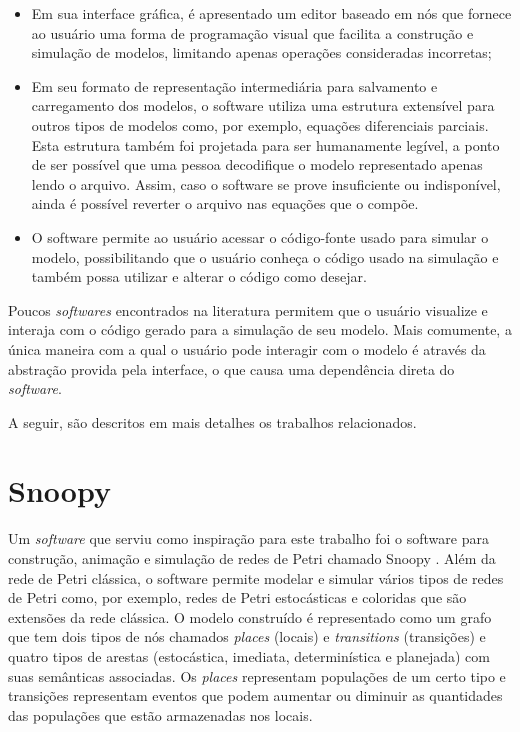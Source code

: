 \documentclass[
	12pt,				%
	openright,			%
	oneside,			%
	a4paper,			%
	main=brazil,
	english,			%
	]{ufsj-abntex2}
\begin{document}
\begin{itemize}
    \item Em sua interface gráfica, é apresentado um editor baseado em nós que fornece ao usuário uma forma de programação visual que facilita a construção e simulação de modelos, limitando apenas operações consideradas incorretas;
    
    \item Em seu formato de representação intermediária para salvamento e carregamento dos modelos, o software utiliza uma estrutura extensível para outros tipos de modelos como, por exemplo, equações diferenciais parciais. Esta estrutura também foi projetada para ser humanamente legível, a ponto de ser possível que uma pessoa decodifique o modelo representado apenas lendo o arquivo. Assim, caso o software se prove insuficiente ou indisponível, ainda é possível reverter o arquivo nas equações que o compõe. 
    
    \item O software permite ao usuário acessar o código-fonte usado para simular o modelo, possibilitando que o usuário conheça o código usado na simulação e também possa utilizar e alterar o código como desejar.   
\end{itemize}

Poucos \textit{softwares} encontrados na literatura permitem que o usuário visualize e interaja com o código gerado para a simulação de seu modelo. Mais comumente, a única maneira com a qual o usuário pode interagir com o modelo é através da abstração provida pela interface, o que causa uma dependência direta do \textit{software}.

A seguir, são descritos em mais detalhes os trabalhos relacionados. 

\section{Snoopy}

Um \textit{software} que serviu como inspiração para este trabalho foi o software para construção, animação e simulação de redes de Petri chamado Snoopy \cite{Heiner2008,Heiner2012,Liu2012}. Além da rede de Petri clássica, o software permite modelar e simular vários tipos de redes de Petri como, por exemplo, redes de Petri estocásticas e coloridas que são extensões da rede clássica. O modelo construído é representado como um grafo que tem dois tipos de nós chamados \textit{places} (locais) e \textit{transitions} (transições) e quatro tipos de arestas (estocástica, imediata, determinística e planejada) com suas semânticas associadas. Os \textit{places} representam populações de um certo tipo e transições representam eventos que podem aumentar ou diminuir as quantidades das populações que estão armazenadas nos locais. 
\end{document}
